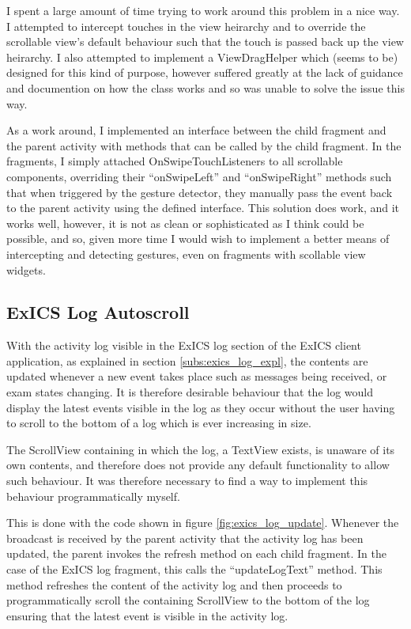 I spent a large amount of time trying to work around this problem in a nice way.  I attempted to intercept touches in the view heirarchy and to override the scrollable view's default behaviour such that the touch is passed back up the view heirarchy.  I also attempted to implement a ViewDragHelper\cite{androidViewDragHelper} which (seems to be) designed for this kind of purpose, however suffered greatly at the lack of guidance and documention on how the class works and so was unable to solve the issue this way.

As a work around, I implemented an interface between the child fragment and the parent activity with methods that can be called by the child fragment.  In the fragments, I simply attached OnSwipeTouchListeners to all scrollable components, overriding their ``onSwipeLeft'' and ``onSwipeRight'' methods such that when triggered by the gesture detector, they manually pass the event back to the parent activity using the defined interface.  This solution does work, and it works well, however, it is not as clean or sophisticated as I think could be possible, and so, given more time I would wish to implement a better means of intercepting and detecting gestures, even on fragments with scollable view widgets.

\FloatBarrier

\subsection{ExICS Log Autoscroll}
\label{subs:log_autoscroll}

With the activity log visible in the ExICS log section of the ExICS client application, as explained in section \ref{subs:exics_log_expl}, the contents are updated whenever a new event takes place such as messages being received, or exam states changing.  It is therefore desirable behaviour that the log would display the latest events visible in the log as they occur without the user having to scroll to the bottom of a log which is ever increasing in size.

The ScrollView containing in which the log, a TextView exists, is unaware of its own contents, and therefore does not provide any default functionality to allow such behaviour.  It was therefore necessary to find a way to implement this behaviour programmatically myself.

This is done with the code shown in figure \ref{fig:exics_log_update}.  Whenever the broadcast is received by the parent activity that the activity log has been updated, the parent invokes the refresh method on each child fragment.  In the case of the ExICS log fragment, this calls the ``updateLogText'' method.  This method refreshes the content of the activity log and then proceeds to programmatically scroll the containing ScrollView to the bottom of the log ensuring that the latest event is visible in the activity log.

